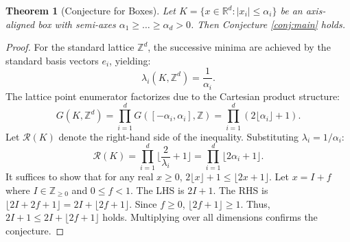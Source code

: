 \documentclass[10pt,a4paper]{amsart}
\newtheorem{theorem}{Theorem}
\newcommand{\R}{\mathbb{R}}
\newcommand{\Z}{\mathbb{Z}}
\newcommand{\floor}[1]{\lfloor #1 \rfloor}
\begin{document}
\begin{theorem}[Conjecture for Boxes] \label{thm:box}
Let $K = \{x \in \R^d : |x_i| \le \alpha_i \}$ be an axis-aligned box with semi-axes $\alpha_1 \ge \dots \ge \alpha_d > 0$. Then Conjecture \ref{conj:main} holds.
\end{theorem}

\begin{proof}
For the standard lattice $\Z^d$, the successive minima are achieved by the standard basis vectors $e_i$, yielding:
\begin{equation}
\lambda_i(K, \Z^d) = \frac{1}{\alpha_i}.
\end{equation}
The lattice point enumerator factorizes due to the Cartesian product structure:
\begin{equation}
G(K, \Z^d) = \prod_{i=1}^d G([-\alpha_i, \alpha_i], \Z) = \prod_{i=1}^d (2\floor{\alpha_i} + 1).
\end{equation}
Let $\mathcal{R}(K)$ denote the right-hand side of the inequality. Substituting $\lambda_i = 1/\alpha_i$:
\begin{equation}
\mathcal{R}(K) = \prod_{i=1}^d \floor{\frac{2}{\lambda_i} + 1} = \prod_{i=1}^d \floor{2\alpha_i + 1}.
\end{equation}
It suffices to show that for any real $x \ge 0$, $2\floor{x} + 1 \le \floor{2x + 1}$.
Let $x = I + f$ where $I \in \Z_{\ge 0}$ and $0 \le f < 1$.
The LHS is $2I + 1$. The RHS is $\floor{2I + 2f + 1} = 2I + \floor{2f + 1}$.
Since $f \ge 0$, $\floor{2f + 1} \ge 1$. Thus, $2I + 1 \le 2I + \floor{2f+1}$ holds.
Multiplying over all dimensions confirms the conjecture.
\end{proof}
\end{document}
